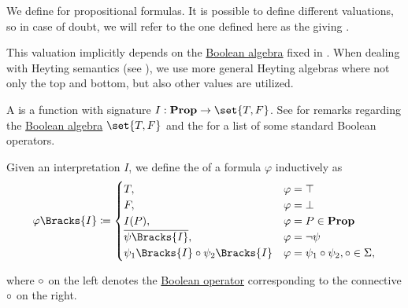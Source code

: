 \begin{definition}\label{def:propositional_valuation}
  We define  for propositional formulas. It is possible to define different valuations, so in case of doubt, we will refer to the one defined here as the  giving .

  This valuation implicitly depends on the \hyperref[def:boolean_algebra]{Boolean algebra} fixed in . When dealing with Heyting semantics (see ), we use more general Heyting algebras where not only the top and bottom, but also other values are utilized.

  \begin{thmenum}
     A  is a function with signature \( I: \boldop{Prop} \to \set{ T, F } \). See  for remarks regarding the \hyperref[def:boolean_algebra]{Boolean algebra} \( \set{ T, F } \) and the  for a list of some standard Boolean operators.

     Given an interpretation \( I \), we define the  of a formula \( \varphi \) inductively as
    \begin{equation}\label{eq:def:propositional_valuation/formula_interpretation}
      \varphi\Bracks{I} \coloneqq \begin{cases}
        T,                                         &\varphi = \top \\
        F,                                         &\varphi = \bot \\
        I(P),                                      &\varphi = P \in \boldop{Prop} \\
        \overline{\psi\Bracks{I}},                 &\varphi = \neg \psi \\
        \psi_1\Bracks{I} \bincirc \psi_2\Bracks{I} &\varphi = \psi_1 \bincirc \psi_2, \bincirc \in \Sigma,
      \end{cases}
    \end{equation}
  \end{thmenum}
  where \( \bincirc \) on the left denotes the \hyperref[def:standard_boolean_operators]{Boolean operator} corresponding to the connective \( \bincirc \) on the right.
\end{definition}

